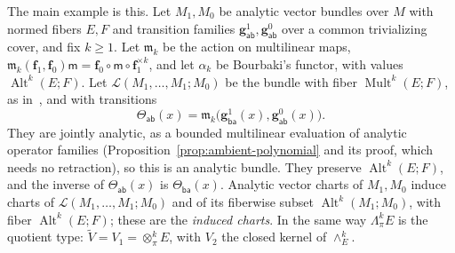 \documentclass[11pt]{amsart}
\theoremstyle{definition}
\theoremstyle{remark}
\numberwithin{equation}{section}
\newcommand{\cL}{\mathcal L}
\newcommand{\Alt}{\operatorname{Alt}}
\newcommand{\Mult}{\operatorname{Mult}}
\theoremstyle{plain}
\theoremstyle{definition}
\theoremstyle{plain}
\begin{document}
The main example is this. Let $M_1,M_0$ be analytic vector bundles over $M$ with normed fibers $E,F$ and transition families $\mathbf g^1_{\mathsf{ab}},\mathbf g^0_{\mathsf{ab}}$ over a common trivializing cover, and fix $k\ge1$. Let $\mathfrak m_k$ be the action on multilinear maps, $\mathfrak m_k(\mathbf f_1,\mathbf f_0)\mathsf m=\mathbf f_0\circ\mathsf m\circ \mathbf f_1^{\times k}$, and let $\alpha_k$ be Bourbaki's functor, with values $\Alt^k(E;F)$. Let $\cL(M_1,\dots,M_1;M_0)$ be the bundle with fiber $\Mult^k(E;F)$, as in~\cite[n\textsuperscript{o}~7.8.1]{Bou}, and with transitions
\[
 \Theta_{\mathsf{ab}}(x)=\mathfrak m_k\bigl(\mathbf g^1_{\mathsf{ba}}(x),\mathbf g^0_{\mathsf{ab}}(x)\bigr).
\]
They are jointly analytic, as a bounded multilinear evaluation of analytic operator families (Proposition~\ref{prop:ambient-polynomial} and its proof, which needs no retraction), so this is an analytic bundle. They preserve $\Alt^k(E;F)$, and the inverse of $\Theta_{\mathsf{ab}}(x)$ is $\Theta_{\mathsf{ba}}(x)$. Analytic vector charts of $M_1,M_0$ induce charts of $\cL(M_1,\dots,M_1;M_0)$ and of its fiberwise subset $\Alt^k(M_1;M_0)$, with fiber $\Alt^k(E;F)$; these are the \emph{induced charts}. In the same way $\Lambda^k_\pi E$ is the quotient type: $\tilde V=V_1=\otimes^k_\pi E$, with $V_2$ the closed kernel of $\wedge^k_E$.
\end{document}
